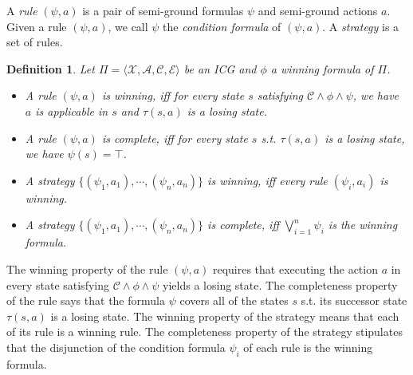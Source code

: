 \documentclass[review]{elsarticle}
\newcommand{\set}[1]{\{ #1 \}}
\newcommand{\tuple}[1]{\langle {#1} \rangle}
\newcommand{\true}{\top}
\newcommand{\statevar}{\mathcal{X}}
\newcommand{\act}{\mathcal{A}}
\newcommand{\constraint}{\mathcal{C}}
\newcommand{\estate}{\mathcal{E}}
\newcommand{\suc}{\tau}
\newtheorem{definition}{Definition}
\begin{document}
	A \textit{rule} $(\psi, a)$ is a pair of semi-ground formulas $\psi$ and semi-ground actions $a$.
	Given a rule $(\psi, a)$, we call $\psi$ the \textit{condition formula} of $(\psi, a)$.
	A \textit{strategy} is a set of rules.
	\begin{definition} \label{def:winRule} \rm
		Let $\Pi = \tuple{\statevar, \act, \constraint, \estate}$ be an ICG and $\phi$ a winning formula of $\Pi$.
		\begin{itemize}
			\item A rule $(\psi, a)$ is \textit{winning}, iff for every state $s$ satisfying $\constraint \land \phi \land \psi$, we have $a$ is applicable in $s$ and $\suc(s, a)$ is a losing state.
			
			\item A rule $(\psi, a)$ is \textit{complete}, iff for every state $s$ s.t. $\suc(s, a)$ is a losing state, we have $\psi(s) = \true$.
			
			\item A strategy $\set{(\psi_1, a_1), \cdots, (\psi_n, a_n) }$ is \textit{winning}, iff every rule $(\psi_i, a_i)$ is winning.
			
			\item A strategy $\set{(\psi_1, a_1), \cdots, (\psi_n, a_n) }$ is \textit{complete}, iff $\bigvee_{i = 1}^n \psi_i$ is the winning formula.
		\end{itemize}
	\end{definition}
	The winning property of the rule $(\psi, a)$ requires that executing the action $a$ in every state satisfying $\constraint \land \phi \land \psi$ yields a losing state.
	The completeness property of the rule says that the formula $\psi$ covers all of the states $s$ s.t. its successor state $\suc(s, a)$ is a losing state.
	The winning property of the strategy means that each of its rule is a winning rule.
	The completeness property of the strategy stipulates that the disjunction of the condition formula $\psi_i$ of each rule is the winning formula.
\end{document}
